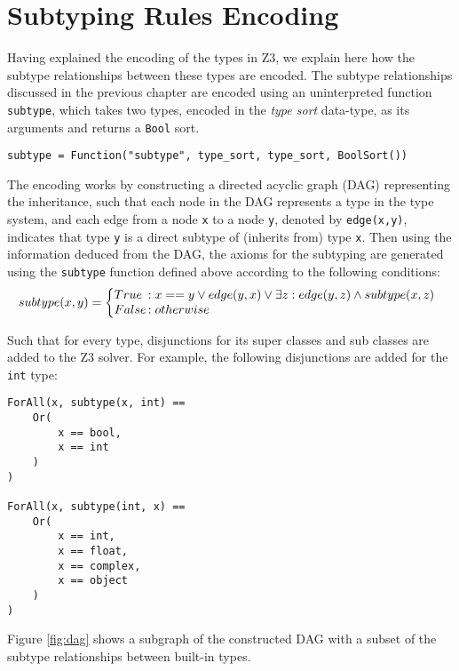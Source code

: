 \section{Subtyping Rules Encoding}\label{sec:sub_encode}
Having explained the encoding of the types in Z3, we explain here how the subtype relationships between these types are encoded. The subtype relationships discussed in the previous chapter are encoded using an uninterpreted function \lstinline|subtype|, which takes two types, encoded in the \textit{type sort} data-type, as its arguments and returns a \lstinline|Bool| sort.
\begin{lstlisting}
subtype = Function("subtype", type_sort, type_sort, BoolSort())
\end{lstlisting}

The encoding works by constructing a directed acyclic graph (DAG) representing the inheritance, such that each node in the DAG represents a type in the type system, and each edge from a node \lstinline|x| to a node \lstinline|y|, denoted by \lstinline|edge(x,y)|, indicates that type \lstinline|y| is a direct subtype of (inherits from) type \lstinline|x|. Then using the information deduced from the DAG, the axioms for the subtyping are generated using the \lstinline|subtype| function defined above according to the following conditions:
\[
	subtype(x,y) = \left\{
	\begin{array}{@{}l@{\thinspace}l}
	True & : x == y \lor edge(y, x) \lor \exists z : edge(y, z) \land subtype(x, z) \\
	False & : otherwise\\
	
	\end{array}
	\right.
\]

Such that for every type, disjunctions for its super classes and sub classes are added to the Z3 solver. For example, the following disjunctions are added for the \lstinline|int| type:

\begin{lstlisting}
ForAll(x, subtype(x, int) == 
	Or(
		x == bool,
		x == int
	)
)

ForAll(x, subtype(int, x) == 
	Or(
		x == int,
		x == float,
		x == complex,
		x == object
	)
)
\end{lstlisting}

Figure \ref{fig:dag} shows a subgraph of the constructed DAG with a subset of the subtype relationships between built-in types.


